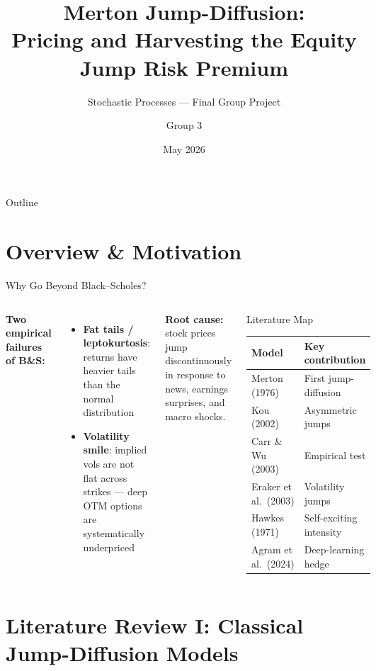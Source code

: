 \documentclass[aspectratio=169,10pt]{beamer}
\title[Jump-Diffusion: Pricing \& Jump Risk Premium]{%
  Merton Jump-Diffusion:\\[2pt]
  Pricing and Harvesting the Equity Jump Risk Premium}
\subtitle{Stochastic Processes --- Final Group Project}
\author[Group 3]{Group 3}
\date{May 2026}
\begin{document}
{
\begin{frame}[plain]
  \titlepage
\end{frame}
}

\begin{frame}{Outline}
\tableofcontents[sectionstyle=show,subsectionstyle=hide]
\end{frame}

\section{Overview \& Motivation}

\begin{frame}{Why Go Beyond Black--Scholes?}
\begin{columns}[T]
\textbf{Two empirical failures of B\&S:}
\begin{itemize}\itemsep2pt
  \item \textbf{Fat tails / leptokurtosis}: returns have heavier tails than the normal distribution
  \item \textbf{Volatility smile}: implied vols are not flat across strikes --- deep OTM options are systematically underpriced
\end{itemize}
\medskip
\textbf{Root cause:} stock prices \alert{jump} discontinuously in response to news, earnings surprises, and macro shocks.

\begin{block}{Literature Map}
\footnotesize
\begin{tabular}{ll}
\toprule
Model & Key contribution \\
\midrule
Merton (1976)   & First jump-diffusion \\
Kou (2002)      & Asymmetric jumps \\
Carr \& Wu (2003) & Empirical test \\
Eraker et al.\ (2003) & Volatility jumps \\
Hawkes (1971)   & Self-exciting intensity \\
Agram et al.\ (2024) & Deep-learning hedge \\
\bottomrule
\end{tabular}
\end{block}
\end{columns}
\end{frame}

\section{Literature Review I: Classical Jump-Diffusion Models}
\end{document}
